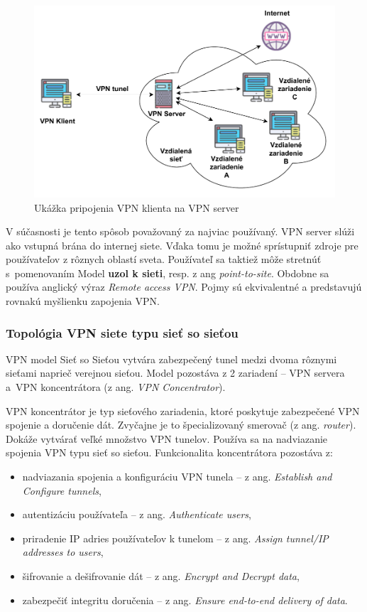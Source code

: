\begin{figure}[!h]
	\centering
	\includegraphics[width=\textwidth]{figures/c2s}
	\caption{Ukážka pripojenia VPN klienta na VPN server}
	\label{c2s}
\end{figure}
V súčasnosti je tento spôsob považovaný za najviac používaný. VPN server slúži ako vstupná brána do internej siete. Vďaka tomu je možné sprístupniť zdroje pre používateľov z rôznych oblastí sveta. Používateľ sa taktiež môže stretnúť s~pomenovaním Model \textbf{uzol k sieti}, resp. z ang \textit{point-to-site}. Obdobne sa používa anglický výraz \textit{Remote access VPN}. Pojmy sú ekvivalentné a predstavujú rovnakú myšlienku zapojenia VPN.  
\subsubsection{Topológia VPN siete typu sieť so sieťou}
VPN model Sieť so Sieťou vytvára zabezpečený tunel medzi dvoma rôznymi sieťami naprieč verejnou sieťou. Model pozostáva z 2 zariadení -- VPN servera a~VPN koncentrátora (z ang. \textit{VPN Concentrator}).

VPN koncentrátor je typ sieťového zariadenia, ktoré poskytuje zabezpečené VPN spojenie a doručenie dát. Zvyčajne je to špecializovaný smerovač (z ang. \textit{router}). Dokáže vytvárať veľké množstvo VPN tunelov. Používa sa na nadviazanie spojenia VPN typu sieť so sieťou. Funkcionalita koncentrátora pozostáva z: 
\begin{itemize}
	\item{nadviazania spojenia a konfiguráciu VPN tunela} -- z ang. \textit{Establish and Configure tunnels},
	\item{autentizáciu používateľa} -- z ang. \textit{Authenticate users},
	\item{priradenie IP adries používateľov k tunelom} -- z ang. \textit{Assign tunnel/IP addresses to users},
	\item{šifrovanie a dešifrovanie dát} -- z ang. \textit{Encrypt and Decrypt data},
	\item{zabezpečiť integritu doručenia} -- z ang. \textit{Ensure end-to-end delivery of data}.
\end{itemize}

